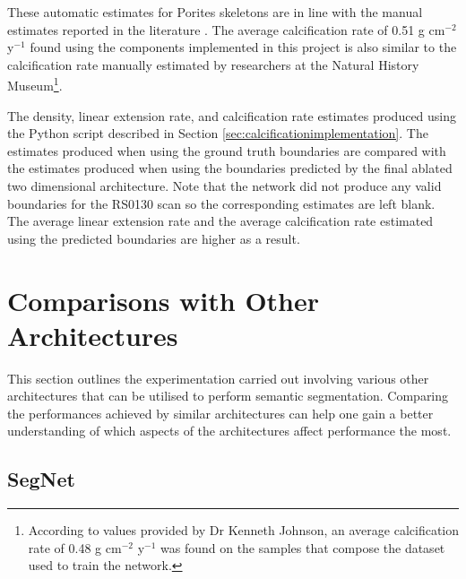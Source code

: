 These automatic estimates for Porites skeletons are in line with the manual estimates reported in the literature \cite{calcification1, calcification2}. The average calcification rate of 0.51 g cm$^{-2}$ y$^{-1}$ found using the components implemented in this project is also similar to the calcification rate manually estimated by researchers at the Natural History Museum\footnote{According to values provided by Dr Kenneth Johnson, an average calcification rate of 0.48 g cm$^{-2}$ y$^{-1}$ was found on the samples that compose the dataset used to train the network.}.



\begin{table}[!t]
    \centering
    \caption{The density, linear extension rate, and calcification rate estimates produced using the Python script described in Section \ref{sec:calcificationimplementation}. The estimates produced when using the ground truth boundaries are compared with the estimates produced when using the boundaries predicted by the final ablated two dimensional architecture. Note that the network did not produce any valid boundaries for the RS0130 scan so the corresponding estimates are left blank. The average linear extension rate and the average calcification rate estimated using the predicted boundaries are higher as a result.}
    \small
    
    \label{tab:calcification}
\end{table}

\section{Comparisons with Other Architectures}

This section outlines the experimentation carried out involving various other architectures that can be utilised to perform semantic segmentation. Comparing the performances achieved by similar architectures can help one gain a better understanding of which aspects of the architectures affect performance the most.

\subsection{SegNet}


